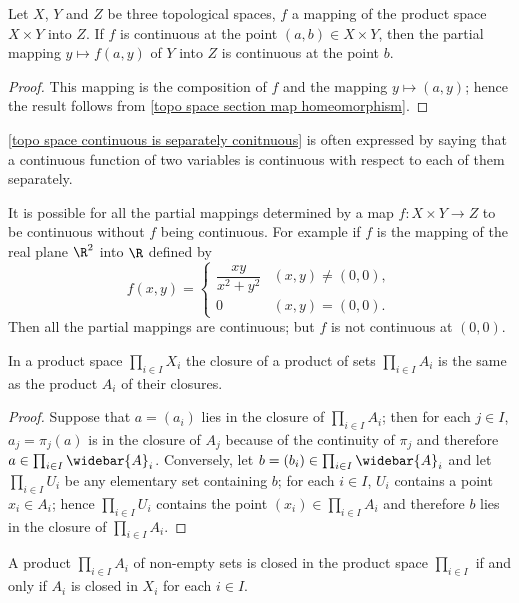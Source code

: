 \begin{proposition}\label{topo space continuous is separately conitnuous}
Let $X$, $Y$ and $Z$ be three topological spaces, $f$ a mapping of the product space $X\times Y$ into $Z$. If $f$ is continuous at the point $(a,b)\in X\times Y$, then the partial mapping $y\mapsto f(a,y)$ of $Y$ into $Z$ is continuous at the point $b$.
\end{proposition}
\begin{proof}
This mapping is the composition of $f$ and the mapping $y\mapsto(a,y)$; hence the result follows from \cref{topo space section map homeomorphism}.
\end{proof}
\cref{topo space continuous is separately conitnuous} is often expressed by saying that a continuous function of two variables is continuous with respect to each of them separately.
\begin{example}
It is possible for all the partial mappings determined by a map $f:X\times Y\to Z$ to be continuous without $f$ being continuous. For example if $f$ is the mapping of the real plane $\R^2$ into $\R$ defined by
\[f(x,y)=\begin{cases}
\dfrac{xy}{x^2+y^2}&(x,y)\neq(0,0),\\
0&(x,y)=(0,0).
\end{cases}\]
Then all the partial mappings are continuous; but $f$ is not continuous at $(0,0)$.
\end{example}
\begin{proposition}\label{topo space closure of product subspace}
In a product space $\prod_{i\in I}X_i$ the closure of a product of sets $\prod_{i\in I}A_i$ is the same as the product $A_i$ of their closures.
\end{proposition}
\begin{proof}
Suppose that $a=(a_i)$ lies in the closure of $\prod_{i\in I}A_i$; then for each $j\in I$, $a_j=\pi_j(a)$ is in the closure of $A_j$ because of the continuity of $\pi_j$ and therefore $a\in\prod_{i\in I}\widebar{A}_i$. Conversely, let $b=(b_i)\in\prod_{i\in I}\widebar{A}_i$ and let $\prod_{i\in I}U_i$ be any elementary set containing $b$; for each $i\in I$, $U_i$ contains a point $x_i\in A_i$; hence $\prod_{i\in I}U_i$ contains the point $(x_i)\in\prod_{i\in I}A_i$ and therefore $b$ lies in the closure of $\prod_{i\in I}A_i$.
\end{proof}
\begin{corollary}
A product $\prod_{i\in I}A_i$ of non-empty sets is closed in the product space $\prod_{i\in I}$ if and only if $A_i$ is closed in $X_i$ for each $i\in I$.
\end{corollary}
